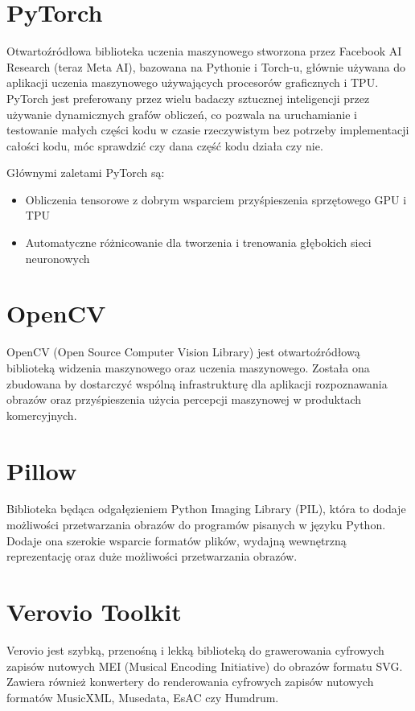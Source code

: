 \section{PyTorch}
Otwartoźródłowa biblioteka uczenia maszynowego stworzona przez Facebook AI Research (teraz Meta AI), bazowana na Pythonie i Torch-u, głównie używana do aplikacji uczenia maszynowego używających procesorów graficznych i TPU. PyTorch jest preferowany przez wielu badaczy sztucznej inteligencji przez używanie dynamicznych grafów obliczeń, co pozwala na uruchamianie i testowanie małych części kodu w czasie rzeczywistym bez potrzeby implementacji całości kodu, móc sprawdzić czy dana część kodu działa czy nie.

Głównymi zaletami PyTorch są:
\begin{itemize}
	\item Obliczenia tensorowe z dobrym wsparciem przyśpieszenia sprzętowego GPU i TPU
	\item Automatyczne różnicowanie dla tworzenia i trenowania głębokich sieci neuronowych
\end{itemize}

\section{OpenCV}
OpenCV (Open Source Computer Vision Library) jest otwartoźródłową biblioteką widzenia maszynowego oraz uczenia maszynowego. Została ona zbudowana by dostarczyć wspólną infrastrukturę dla aplikacji rozpoznawania obrazów oraz przyśpieszenia użycia percepcji maszynowej w produktach komercyjnych.

\section{Pillow}
Biblioteka będąca odgałęzieniem Python Imaging Library (PIL), która to dodaje możliwości przetwarzania obrazów do programów pisanych w języku Python. Dodaje ona szerokie wsparcie formatów plików, wydajną wewnętrzną reprezentację oraz duże możliwości przetwarzania obrazów. 

\section{Verovio Toolkit}
Verovio jest szybką, przenośną i lekką biblioteką do grawerowania cyfrowych zapisów nutowych MEI (Musical Encoding Initiative) do obrazów formatu SVG. Zawiera również konwertery do renderowania cyfrowych zapisów nutowych formatów MusicXML, Musedata, EsAC czy Humdrum.